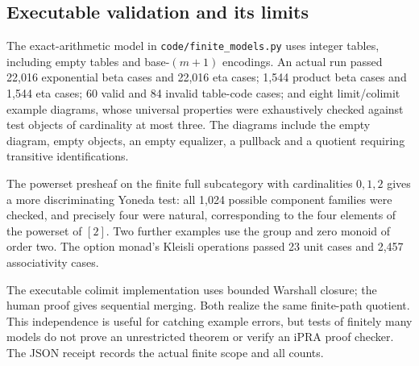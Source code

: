 \subsection{Executable validation and its limits}
The exact-arithmetic model in \texttt{code/finite\_models.py} uses integer
tables, including empty tables and base-$(m+1)$ encodings. An actual run
passed 22,016 exponential beta cases and 22,016 eta cases; 1,544 product
beta cases and 1,544 eta cases; 60 valid and 84 invalid table-code cases;
and eight limit/colimit example diagrams, whose universal properties were
exhaustively checked against test objects of cardinality at most three.
The diagrams include the empty diagram, empty objects, an empty equalizer,
a pullback and a quotient requiring transitive identifications.

The powerset presheaf on the finite full subcategory with cardinalities
$0,1,2$ gives a more discriminating Yoneda test: all 1,024 possible
component families were checked, and precisely four were natural,
corresponding to the four elements of the powerset of $[2]$.
Two further examples use the group and zero monoid of order two.
The option monad's Kleisli operations passed 23 unit cases and 2,457
associativity cases.

The executable colimit implementation uses bounded Warshall closure;
the human proof gives sequential merging. Both realize the same
finite-path quotient. This independence is useful for catching example
errors, but tests of finitely many models do not prove an unrestricted
theorem or verify an iPRA proof checker. The JSON receipt records the
actual finite scope and all counts.
